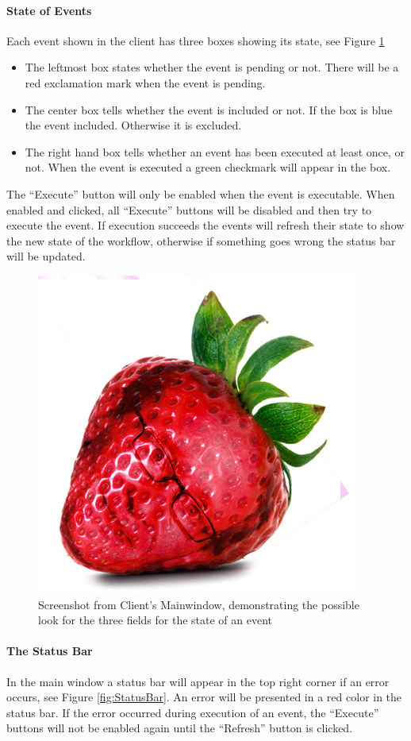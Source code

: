 \paragraph{State of Events}
Each event shown in the client has three boxes showing its state, see Figure \ref{fig:StateFieldsMainClient}
\begin{itemize}
\item The leftmost box states whether the event is pending or not. There will be a red exclamation mark when the event is pending.
\item The center box tells whether the event is included or not. If the box is blue the event included. Otherwise it is excluded.
\item The right hand box tells whether an event has been executed at least once, or not. When the event is executed a green checkmark will appear in the box.
\end{itemize}
The “Execute” button will only be enabled when the event is executable. When enabled and clicked, all “Execute” buttons will be disabled and then try to execute the event. If execution succeeds the events will refresh their state to show the new state of the workflow, otherwise if something goes wrong the status bar will be updated.

\begin{figure}[h!]
\centering
\includegraphics[width=0.4\linewidth]{Figures/strawberry}
\caption{\label{fig:StateFieldsMainClient}Screenshot from Client's Mainwindow, demonstrating the possible look for the three fields for the state of an event}
\end{figure}

\paragraph{The Status Bar}
In the main window a status bar will appear in the top right corner if an error occurs, see Figure \ref{fig:StatusBar}. An error will be presented in a red color in the status bar. If the error occurred during execution of an event, the “Execute” buttons will not be enabled again until the “Refresh” button is clicked.

